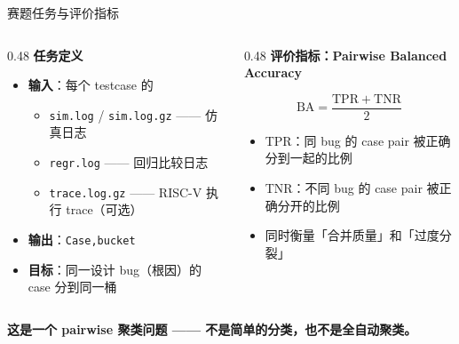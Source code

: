 \documentclass[aspectratio=169,UTF8]{ctexbeamer}
\newcommand{\key}[1]{\textcolor{ICCADBlue}{\textbf{#1}}}
\begin{document}
\begin{frame}{赛题任务与评价指标}
  \small
  \begin{columns}[T]
    \begin{column}{0.48\textwidth}
      \textbf{任务定义}
      \begin{itemize}
        \item \textbf{输入}：每个 testcase 的
        \begin{itemize}
          \item \texttt{sim.log} / \texttt{sim.log.gz} —— 仿真日志
          \item \texttt{regr.log} —— 回归比较日志
          \item \texttt{trace.log.gz} —— RISC-V 执行 trace（可选）
        \end{itemize}
        \item \textbf{输出}：\texttt{Case,bucket}
        \item \textbf{目标}：同一设计 bug（根因）的 case 分到同一桶
      \end{itemize}
    \end{column}
    \begin{column}{0.48\textwidth}
      \textbf{评价指标：Pairwise Balanced Accuracy}
      \vspace{2mm}

      {\Large \[ \mathrm{BA} = \frac{\mathrm{TPR} + \mathrm{TNR}}{2} \]}

      \vspace{2mm}
      \begin{itemize}
        \item TPR：同 bug 的 case pair 被正确分到一起的比例
        \item TNR：不同 bug 的 case pair 被正确分开的比例
        \item 同时衡量「合并质量」和「过度分裂」
      \end{itemize}
    \end{column}
  \end{columns}

  \vspace{3mm}
  \begin{center}
    \key{这是一个 pairwise 聚类问题 —— 不是简单的分类，也不是全自动聚类。}
  \end{center}
\end{frame}
\end{document}
